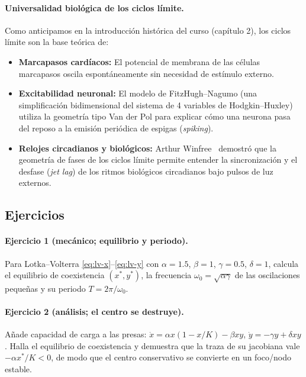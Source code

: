 \paragraph{Universalidad biológica de los ciclos límite.}
Como anticipamos en la introducción histórica del curso (capítulo 2), los ciclos límite son la base teórica de:
\begin{itemize}
    \item \textbf{Marcapasos cardíacos:} El potencial de membrana de las células marcapasos oscila espontáneamente sin necesidad de estímulo externo.
    \item \textbf{Excitabilidad neuronal:} El modelo de FitzHugh--Nagumo (una simplificación bidimensional del sistema de 4 variables de Hodgkin--Huxley) utiliza la geometría tipo Van der Pol para explicar cómo una neurona pasa del reposo a la emisión periódica de espigas (\emph{spiking}).
    \item \textbf{Relojes circadianos y biológicos:} Arthur Winfree~\cite{winfree2001} demostró que la geometría de fases de los ciclos límite permite entender la sincronización y el desfase (\emph{jet lag}) de los ritmos biológicos circadianos bajo pulsos de luz externos.
\end{itemize}

\subsection{Ejercicios}

\paragraph{Ejercicio 1 (mecánico; equilibrio y periodo).} Para Lotka--Volterra \eqref{eq:lv-x}--\eqref{eq:lv-y} con $\alpha=1.5$, $\beta=1$, $\gamma=0.5$, $\delta=1$, calcula el equilibrio de coexistencia $(x^*,y^*)$, la frecuencia $\omega_0=\sqrt{\alpha\gamma}$ de las oscilaciones pequeñas y su periodo $T=2\pi/\omega_0$.

\paragraph{Ejercicio 2 (análisis; el centro se destruye).} Añade capacidad de carga a las presas: $\dot{x}=\alpha x(1-x/K)-\beta xy$, $\dot{y}=-\gamma y+\delta xy$. Halla el equilibrio de coexistencia y demuestra que la traza de su jacobiana vale $-\alpha x^*/K<0$, de modo que el centro conservativo se convierte en un foco/nodo estable.

